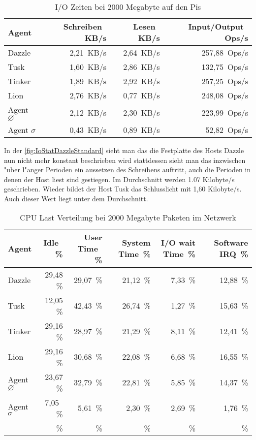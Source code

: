 \begin{table}
\centering
\begin{tabular}{l%
 r<{\,KB/s}%
 r<{\,KB/s}%
 r<{\,Ops/s}%
}
Agent	  			& Schreiben	 	& Lesen			& Input/Output 		\\	
\hline
Dazzle 				& 2,21			& 2,64			& 257,88	        \\
Tusk 				& 1,60			& 2,86			& 132,75			\\
Tinker				& 1,89 			& 2,92			& 257,25		 	\\
Lion				& 2,76			& 0,77			& 248,08	 	\\
Agent $\diameter $  		& 2,12			& 2,30			& 223,99		\\   
Agent $\sigma $ 		& 0,43  		& 0,89			& 52,82		\\
\end{tabular}
\caption{I/O Zeiten bei 2000 Megabyte auf den Pis}
\label{tab:NormalbetriebIoStat2000Mb}
\end{table}


In der \cref{fig:IoStatDazzleStandard} sieht man das die Festplatte des Hosts Dazzle nun nicht %
mehr konstant beschrieben wird stattdessen sieht man das inzwischen "uber l"anger Perioden %
ein aussetzen des Schreibens auftritt, auch die Perioden in denen der Host liest sind gestiegen. %
Im Durchschnitt werden 1.07 Kilobyte/s geschrieben. Wieder bildet der Host Tusk das %
Schlusslicht mit 1,60 Kilobyte/s. Auch dieser Wert liegt unter dem Durchschnitt. %


\begin{table}
\centering
\begin{tabular}{l%
 r<{\,\%}%
 r<{\,\%}%
 r<{\,\%}%
 r<{\,\%}%
 r<{\,\%}%
}
Agent  				& Idle			& User Time		& System Time		& I/O wait Time	& Software IRQ	\\
\hline
Dazzle 				& 29,48			& 29,07			& 21,12 		& 7,33		& 12,88	\\
Tusk 				& 12,05			& 42,43			& 26,74			& 1,27		& 15,63	\\
Tinker				& 29,16			& 28,97			& 21,29			& 8,11		& 12,41	\\
Lion				& 29,16			& 30,68			& 22,08			& 6,68		& 16,55	\\ 
Agent $\diameter $  		& 23,67			& 32,79			& 22,81			& 5,85	 	& 14,37	\\   
Agent $\sigma $			&  7,05			&  5,61			&  2,30			& 2,69		& 1,76  \\ 

&\end{tabular}
\caption{CPU Last Verteilung bei 2000 Megabyte Paketen im Netzwerk}
\label{tab:CPUlastverteilung2000Mb}
\end{table}

